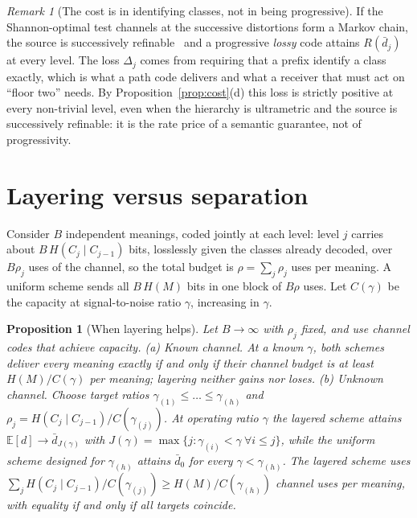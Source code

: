 \documentclass[11pt]{article}
\newtheorem{proposition}[theorem]{Proposition}
\theoremstyle{definition}
\theoremstyle{remark}
\newtheorem{remark}{Remark}
\newcommand{\E}{\mathbb{E}}
\begin{document}
\begin{remark}[The cost is in identifying classes, not in being progressive]
If the Shannon-optimal test channels at the successive distortions form a Markov chain, the source is successively refinable~\cite{equitz1991} and a progressive \emph{lossy} code attains $R(\bar d_j)$ at every level. The loss $\Delta_j$ comes from requiring that a prefix identify a class exactly, which is what a path code delivers and what a receiver that must act on ``floor two'' needs. By Proposition~\ref{prop:cost}(d) this loss is strictly positive at every non-trivial level, even when the hierarchy is ultrametric and the source is successively refinable: it is the rate price of a semantic guarantee, not of progressivity.
\end{remark}

\section{Layering versus separation}

Consider $B$ independent meanings, coded jointly at each level: level $j$ carries about $B\,H(C_j\mid C_{j-1})$ bits, losslessly given the classes already decoded, over $B\rho_j$ uses of the channel, so the total budget is $\rho=\sum_j\rho_j$ uses per meaning. A uniform scheme sends all $B\,H(M)$ bits in one block of $B\rho$ uses. Let $C(\gamma)$ be the capacity at signal-to-noise ratio $\gamma$, increasing in $\gamma$.

\begin{proposition}[When layering helps]\label{prop:sep}
Let $B\to\infty$ with $\rho_j$ fixed, and use channel codes that achieve capacity.
(a) \emph{Known channel.} At a known $\gamma$, both schemes deliver every meaning exactly if and only if their channel budget is at least $H(M)/C(\gamma)$ per meaning; layering neither gains nor loses.
(b) \emph{Unknown channel.} Choose target ratios $\gamma_{(1)}\le\dots\le\gamma_{(h)}$ and $\rho_j=H(C_j\mid C_{j-1})/C(\gamma_{(j)})$. At operating ratio $\gamma$ the layered scheme attains $\E[d]\to\bar d_{J(\gamma)}$ with $J(\gamma)=\max\{j:\gamma_{(i)}<\gamma\ \forall i\le j\}$, while the uniform scheme designed for $\gamma_{(h)}$ attains $\bar d_0$ for every $\gamma<\gamma_{(h)}$. The layered scheme uses $\sum_jH(C_j\mid C_{j-1})/C(\gamma_{(j)})\ge H(M)/C(\gamma_{(h)})$ channel uses per meaning, with equality if and only if all targets coincide.
\end{proposition}
\end{document}

